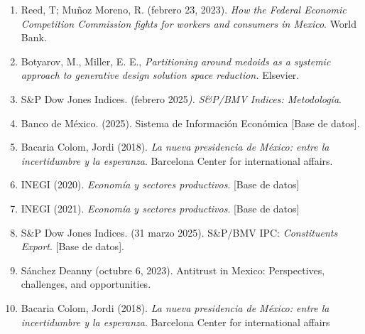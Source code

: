 \documentclass[
]{article}
\begin{document}
\begin{enumerate}
{asset allocation strategies} {[}tesis master, Copenhagen Business
School{]}.
\item
Reed, T; Muñoz Moreno, R. (febrero 23, 2023). \emph{How the Federal Economic
Competition Commission fights for workers and consumers in Mexico}.
World Bank.
\item
Botyarov, M., Miller, E. E., \emph{Partitioning around medoids as a
systemic approach to generative design solution space reduction.}
Elsevier.
\item
S\&P Dow Jones Indices. (febrero 2025\emph{). S\&P/BMV Indices:
Metodología}.
\item
Banco de México. (2025). Sistema de Información Económica {[}Base de datos{]}.
\item 
Bacaria Colom, Jordi (2018). \textit{La nueva presidencia de México: entre la incertidumbre y la esperanza}. Barcelona Center for international affairs.
\item 
INEGI (2020). \textit{Economía y sectores productivos}. [Base de datos]
\item 
INEGI (2021). \textit{Economía y sectores productivos}. [Base de datos]
\item
S\&P Dow Jones Indices. (31 marzo 2025). S\&P/BMV IPC: \emph{Constituents Export}. {[}Base de datos{]}.
\item
Sánchez Deanny (octubre 6, 2023). Antitrust in Mexico: Perspectives,
challenges, and opportunities.
\item Bacaria Colom, Jordi (2018). \emph{La nueva presidencia de México: entre la
incertidumbre y la esperanza}. Barcelona Center for international affairs
\end{enumerate}
\end{document}
